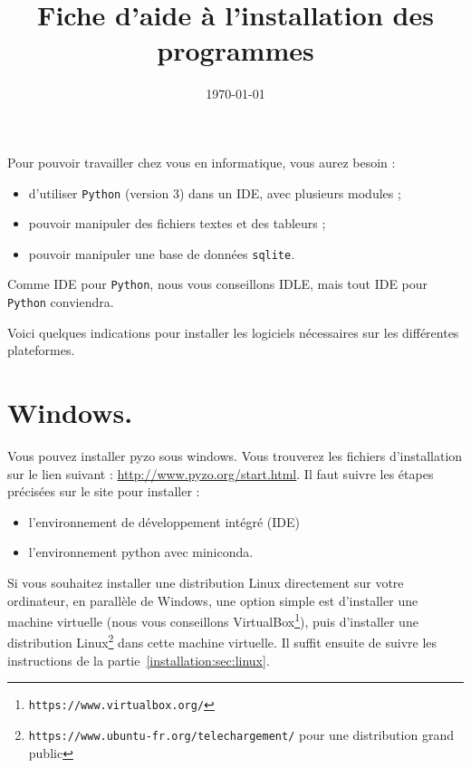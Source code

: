 \documentclass[francais,a4paper,DIV=16]{scrartcl}
\title{Fiche d'aide à l'installation des programmes}
\date{\today}
\begin{document}
\maketitle{}

Pour pouvoir travailler chez vous en informatique, vous aurez besoin :
\begin{itemize}
  \item d'utiliser \texttt{Python} (version 3) dans un IDE, avec plusieurs modules ; 
  \item pouvoir manipuler des fichiers textes et des tableurs ; 
  \item pouvoir manipuler une base de données \texttt{sqlite}.
\end{itemize}
Comme IDE pour \texttt{Python}, nous vous conseillons {IDLE}, mais tout IDE pour \texttt{Python} conviendra. 

Voici quelques indications pour installer les logiciels nécessaires sur les différentes plateformes. 


\section{Windows.}

Vous pouvez installer pyzo sous windows. Vous trouverez les fichiers d'installation sur le lien suivant : \url{http://www.pyzo.org/start.html}. Il faut suivre les étapes précisées sur le site pour installer : 
\begin{itemize}
\item l'environnement de développement intégré (IDE)
\item l'environnement python avec miniconda.
\end{itemize}
%
%
Si vous souhaitez installer une distribution Linux directement sur votre ordinateur, en parallèle de Windows, une option simple est d'installer une machine virtuelle (nous vous conseillons {VirtualBox}\footnote{\texttt{https://www.virtualbox.org/}}), puis d'installer une distribution Linux\footnote{\texttt{https://www.ubuntu-fr.org/telechargement/} pour une distribution grand public} dans cette machine virtuelle. 
Il suffit ensuite de suivre les instructions de la partie~\ref{installation:sec:linux}.
%
%
\end{document}
